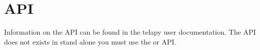 \chapter{API}

Information on the \gaia API can be found in the telapy user documentation. The
\gaia API does not exists in stand alone you must use the  or
 API.
